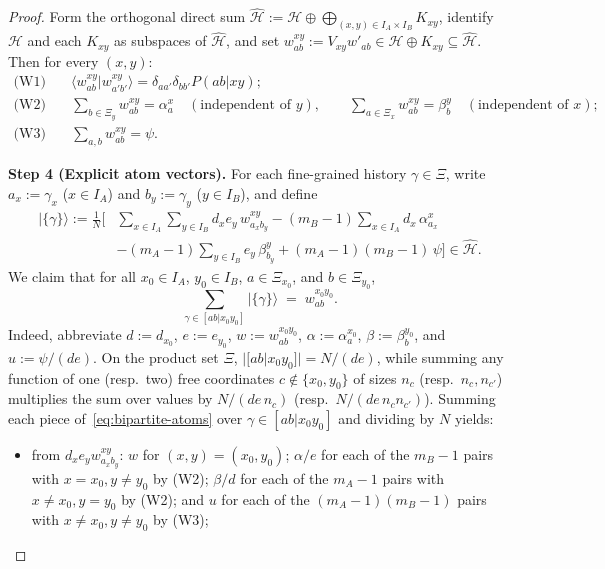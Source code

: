 \documentclass[11pt,a4paper]{article}
\theoremstyle{definition}
\theoremstyle{remark}
\newcommand{\HH}{\mathcal{H}}
\newcommand{\ket}[1]{|#1\rangle}
\newcommand{\braket}[2]{\langle #1 | #2 \rangle}
\begin{document}
\begin{proof}
Form the orthogonal direct sum $\widehat{\HH} := \HH \oplus \bigoplus_{(x,y) \in I_A \times I_B} K_{xy}$, identify $\HH$ and each $K_{xy}$ as subspaces of $\widehat{\HH}$, and set $w^{xy}_{ab} := V_{xy} w'_{ab} \in \HH \oplus K_{xy} \subseteq \widehat{\HH}$. Then for every $(x,y)$:
\begin{align*}
\text{(W1)}\quad & \braket{w^{xy}_{ab}}{w^{xy}_{a'b'}} = \delta_{aa'}\delta_{bb'} P(ab|xy); \\
\text{(W2)}\quad & \sum_{b \in \Xi_y} w^{xy}_{ab} = \alpha^x_a \quad (\text{independent of } y), \qquad \sum_{a \in \Xi_x} w^{xy}_{ab} = \beta^y_b \quad (\text{independent of } x); \\
\text{(W3)}\quad & \sum_{a,b} w^{xy}_{ab} = \psi.
\end{align*}

\medskip\noindent\textbf{Step 4 (Explicit atom vectors).} For each fine-grained history $\gamma \in \Xi$, write $a_x := \gamma_x$ ($x \in I_A$) and $b_y := \gamma_y$ ($y \in I_B$), and define
\begin{equation}\label{eq:bipartite-atoms}
\begin{aligned}
\ket{\{\gamma\}} := \frac{1}{N} \Biggl[
&\sum_{x \in I_A}\sum_{y \in I_B} d_x e_y\, w^{xy}_{a_x b_y}
- (m_B - 1)\sum_{x \in I_A} d_x\, \alpha^x_{a_x} \\
&- (m_A - 1)\sum_{y \in I_B} e_y\, \beta^y_{b_y}
+ (m_A - 1)(m_B - 1)\,\psi
\Biggr] \in \widehat{\HH}.
\end{aligned}
\end{equation}
We claim that for all $x_0 \in I_A$, $y_0 \in I_B$, $a \in \Xi_{x_0}$, and $b \in \Xi_{y_0}$,
\begin{equation}\label{eq:claimA}
\sum_{\gamma \in [ab|x_0 y_0]} \ket{\{\gamma\}} \;=\; w^{x_0 y_0}_{ab}.
\end{equation}
Indeed, abbreviate $d := d_{x_0}$, $e := e_{y_0}$, $w := w^{x_0 y_0}_{ab}$, $\alpha := \alpha^{x_0}_a$, $\beta := \beta^{y_0}_b$, and $u := \psi/(de)$. On the product set $\Xi$, $|[ab|x_0 y_0]| = N/(de)$, while summing any function of one (resp.\ two) free coordinates $c \notin \{x_0, y_0\}$ of sizes $n_c$ (resp.\ $n_c, n_{c'}$) multiplies the sum over values by $N/(de\,n_c)$ (resp.\ $N/(de\,n_c n_{c'})$). Summing each piece of~\eqref{eq:bipartite-atoms} over $\gamma \in [ab|x_0 y_0]$ and dividing by $N$ yields:
\begin{itemize}[leftmargin=*,nosep]
\item from $d_x e_y w^{xy}_{a_x b_y}$: $w$ for $(x,y)=(x_0,y_0)$; $\alpha/e$ for each of the $m_B - 1$ pairs with $x=x_0, y\neq y_0$ by (W2); $\beta/d$ for each of the $m_A - 1$ pairs with $x\neq x_0, y=y_0$ by (W2); and $u$ for each of the $(m_A - 1)(m_B - 1)$ pairs with $x\neq x_0, y\neq y_0$ by (W3);

\end{itemize}
\end{proof}
\end{document}
